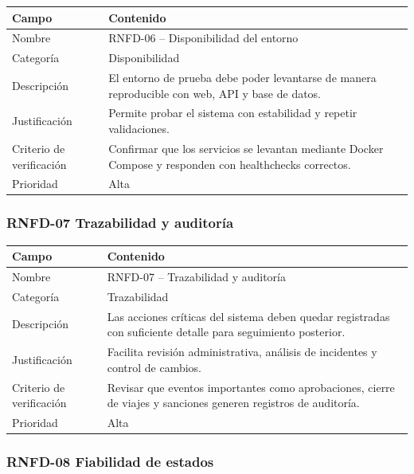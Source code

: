 \documentclass[12pt]{article}
\begin{document}
\begin{tabularx}{\textwidth}{|P{3.3cm}|Y|}
\hline
{}
\textbf{Campo} & \textbf{Contenido} \\
\hline
Nombre & RNFD-06 -- Disponibilidad del entorno \\
\hline
Categor\'ia & Disponibilidad \\
\hline
Descripci\'on & El entorno de prueba debe poder levantarse de manera reproducible con web, API y base de datos. \\
\hline
Justificaci\'on & Permite probar el sistema con estabilidad y repetir validaciones. \\
\hline
Criterio de verificaci\'on & Confirmar que los servicios se levantan mediante Docker Compose y responden con healthchecks correctos. \\
\hline
Prioridad & Alta \\
\hline
\end{tabularx}

\subsubsection{RNFD-07 Trazabilidad y auditor\'ia}

\begin{tabularx}{\textwidth}{|P{3.3cm}|Y|}
\hline
{}
\textbf{Campo} & \textbf{Contenido} \\
\hline
Nombre & RNFD-07 -- Trazabilidad y auditor\'ia \\
\hline
Categor\'ia & Trazabilidad \\
\hline
Descripci\'on & Las acciones cr\'iticas del sistema deben quedar registradas con suficiente detalle para seguimiento posterior. \\
\hline
Justificaci\'on & Facilita revisi\'on administrativa, an\'alisis de incidentes y control de cambios. \\
\hline
Criterio de verificaci\'on & Revisar que eventos importantes como aprobaciones, cierre de viajes y sanciones generen registros de auditor\'ia. \\
\hline
Prioridad & Alta \\
\hline
\end{tabularx}

\subsubsection{RNFD-08 Fiabilidad de estados}
\end{document}
